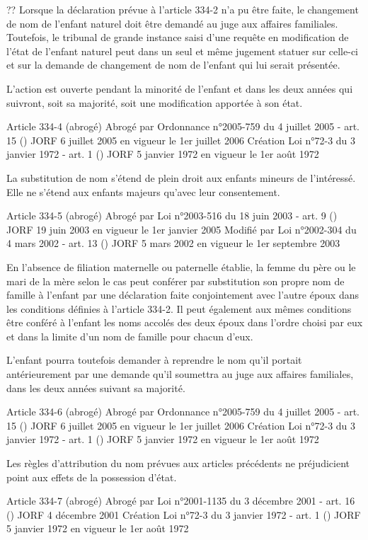 \documentclass[
  12pt,
]{book}
\begin{document}
\begin{encadre}{??}
Lorsque la déclaration prévue à l'article 334-2 n'a pu être faite, le changement de nom de l'enfant naturel doit être demandé au juge aux affaires familiales. Toutefois, le tribunal de grande instance saisi d'une requête en modification de l'état de l'enfant naturel peut dans un seul et même jugement statuer sur celle-ci et sur la demande de changement de nom de l'enfant qui lui serait présentée.

L'action est ouverte pendant la minorité de l'enfant et dans les deux années qui suivront, soit sa majorité, soit une modification apportée à son état.

Article 334-4 (abrogé)
Abrogé par Ordonnance n°2005-759 du 4 juillet 2005 - art. 15 () JORF 6 juillet 2005 en vigueur le 1er juillet 2006
Création Loi n°72-3 du 3 janvier 1972 - art. 1 () JORF 5 janvier 1972 en vigueur le 1er août 1972

La substitution de nom s'étend de plein droit aux enfants mineurs de l'intéressé. Elle ne s'étend aux enfants majeurs qu'avec leur consentement.

Article 334-5 (abrogé)
Abrogé par Loi n°2003-516 du 18 juin 2003 - art. 9 () JORF 19 juin 2003 en vigueur le 1er janvier 2005
Modifié par Loi n°2002-304 du 4 mars 2002 - art. 13 () JORF 5 mars 2002 en vigueur le 1er septembre 2003

En l'absence de filiation maternelle ou paternelle établie, la femme du père ou le mari de la mère selon le cas peut conférer par substitution son propre nom de famille à l'enfant par une déclaration faite conjointement avec l'autre époux dans les conditions définies à l'article 334-2. Il peut également aux mêmes conditions être conféré à l'enfant les noms accolés des deux époux dans l'ordre choisi par eux et dans la limite d'un nom de famille pour chacun d'eux.

L'enfant pourra toutefois demander à reprendre le nom qu'il portait antérieurement par une demande qu'il soumettra au juge aux affaires familiales, dans les deux années suivant sa majorité.

Article 334-6 (abrogé)
Abrogé par Ordonnance n°2005-759 du 4 juillet 2005 - art. 15 () JORF 6 juillet 2005 en vigueur le 1er juillet 2006
Création Loi n°72-3 du 3 janvier 1972 - art. 1 () JORF 5 janvier 1972 en vigueur le 1er août 1972

Les règles d'attribution du nom prévues aux articles précédents ne préjudicient point aux effets de la possession d'état.

Article 334-7 (abrogé)
Abrogé par Loi n°2001-1135 du 3 décembre 2001 - art. 16 () JORF 4 décembre 2001
Création Loi n°72-3 du 3 janvier 1972 - art. 1 () JORF 5 janvier 1972 en vigueur le 1er août 1972


\end{encadre}
\end{document}
